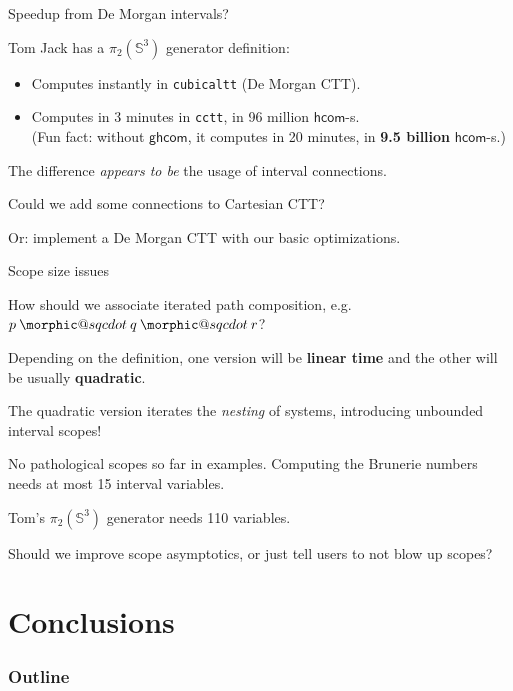 \documentclass[dvipsnames]{beamer}
\makeatletter
\DeclareRobustCommand{\sqcdot}{\mathbin{\mathpalette\morphic@sqcdot\relax}}
\newcommand{\morphic@sqcdot}[2]{%
  \sbox\z@{$\m@th#1\centerdot$}%
  \ht\z@=.33333\ht\z@
  \vcenter{\box\z@}%
}
\newcommand{\ms}[1]{\mathsf{#1}}
\newcommand{\hcom}{\ms{hcom}}
\newcommand{\ghcom}{\ms{ghcom}}
\makeatother
\begin{document}
\begin{frame}{Speedup from De Morgan intervals?}

Tom Jack has a $\pi_2(\mathbb{S}^3)$ generator definition:
\begin{itemize}
  \item Computes instantly in \texttt{cubicaltt} (De Morgan CTT).
  \item Computes in 3 minutes in \texttt{cctt}, in 96 million $\hcom$-s.\\
        (Fun fact: without $\ghcom$, it computes in 20 minutes, in
         \textbf{9.5 billion} $\hcom$-s.)
\end{itemize}
\vspace{1em}
\pause

The difference \emph{appears to be} the usage of interval connections.
\vspace{1em}

Could we add some connections to Cartesian CTT?
\vspace{1em}

Or: implement a De Morgan CTT with our basic optimizations.

\end{frame}

\begin{frame}{Scope size issues}

How should we associate iterated path composition, e.g.\ $p \sqcdot q \sqcdot r$?
\vspace{1em}
\pause

Depending on the definition, one version will be \textbf{linear time}
and the other will be usually \textbf{quadratic}.
\vspace{1em}
\pause

The quadratic version iterates the \emph{nesting} of systems, introducing
unbounded interval scopes!
\vspace{1em}
\pause

No pathological scopes so far in examples. Computing the Brunerie
numbers needs at most 15 interval variables.
\vspace{1em}
\pause

Tom's $\pi_2(\mathbb{S}^3)$ generator needs 110 variables.
\vspace{1em}
\pause

Should we improve scope asymptotics, or just tell users to not blow up scopes?
\pause

\end{frame}

\section{Conclusions}
\begin{frame}
  \frametitle{Outline}
  \tableofcontents[currentsection]
\end{frame}
\end{document}
